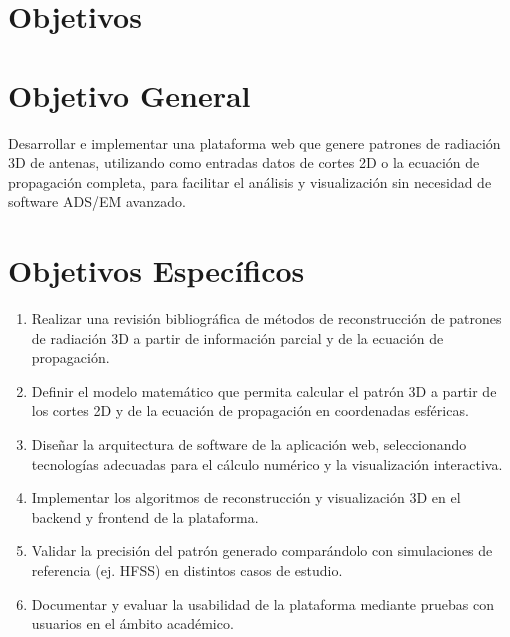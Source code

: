 \section{\LARGE Objetivos}
\section{Objetivo General}
Desarrollar e implementar una plataforma web que genere patrones de radiación 3D de antenas, utilizando como entradas datos de cortes 2D o la ecuación de propagación completa, para facilitar el análisis y visualización sin necesidad de software ADS/EM avanzado.

\section{Objetivos Específicos}
\begin{enumerate}
  \item Realizar una revisión bibliográfica de métodos de reconstrucción de patrones de radiación 3D a partir de información parcial y de la ecuación de propagación.
  \item Definir el modelo matemático que permita calcular el patrón 3D a partir de los cortes 2D y de la ecuación de propagación en coordenadas esféricas.
  \item Diseñar la arquitectura de software de la aplicación web, seleccionando tecnologías adecuadas para el cálculo numérico y la visualización interactiva.
  \item Implementar los algoritmos de reconstrucción y visualización 3D en el backend y frontend de la plataforma.
  \item Validar la precisión del patrón generado comparándolo con simulaciones de referencia (ej. HFSS) en distintos casos de estudio.
  \item Documentar y evaluar la usabilidad de la plataforma mediante pruebas con usuarios en el ámbito académico.
\end{enumerate}
